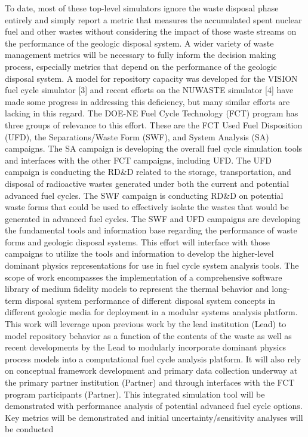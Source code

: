 To date, most of these top-level simulators ignore the waste disposal phase entirely and simply 
report a metric that measures the accumulated spent nuclear fuel and other wastes without 
considering the impact of those waste streams on the performance of the geologic disposal system.  A 
wider variety of waste management metrics will be necessary to fully inform the decision making 
process, especially metrics that depend on the performance of the geologic disposal system.  A model 
for repository capacity was developed for the VISION fuel cycle simulator [3] and recent efforts on 
the NUWASTE simulator [4] have made some progress in addressing this deficiency, but many similar 
efforts are lacking in this regard.  The DOE-NE Fuel Cycle Technology (FCT) program has three groups 
of relevance to this effort.  These are the FCT Used Fuel Disposition (UFD), the Separations/Waste 
Form (SWF), and System Analysis (SA) campaigns.  The SA campaign is developing the overall fuel 
cycle simulation tools and interfaces with the other FCT campaigns, including UFD.  The UFD campaign 
is conducting the RD\&D related to the storage, transportation, and disposal of radioactive wastes 
generated under both the current and potential advanced fuel cycles.  The SWF campaign is conducting 
RD\&D on potential waste forms that could be used to effectively isolate the wastes that would be 
generated in advanced fuel cycles.  The SWF and UFD campaigns are developing the fundamental tools 
and information base regarding the performance of waste forms and geologic disposal systems.  This 
effort will interface with those campaigns to utilize the tools and information to develop the 
higher-level dominant physics representations for use in fuel cycle system analysis tools.  The 
scope of work encompasses the implementation of a comprehensive software library of medium fidelity 
models to represent the thermal behavior and long-term disposal system performance of different 
disposal system concepts in different geologic media for deployment in a modular systems analysis 
platform.  This work will leverage upon previous work by the lead institution (Lead) to model 
repository behavior as a function of the contents of the waste as well as recent developments by the 
Lead to modularly incorporate dominant physics process models into a computational fuel cycle 
analysis platform.  It will also rely on conceptual framework development and primary data 
collection underway at the primary partner institution (Partner) and through interfaces with the FCT 
program participants (Partner).  This integrated simulation tool will be demonstrated with 
performance analysis of potential advanced fuel cycle options.  Key metrics will be demonstrated and 
initial uncertainty/sensitivity analyses will be conducted

